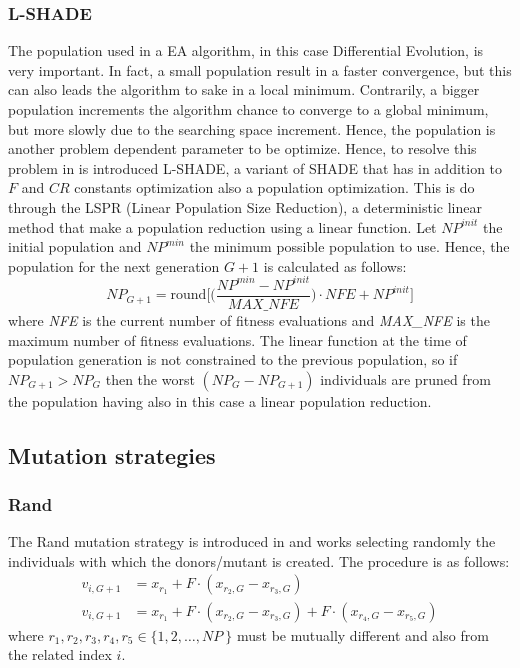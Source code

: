 \subsubsection{L-SHADE}
The population used in a EA algorithm, in this case Differential Evolution, is very important. In fact, a small population result in a faster convergence, but this can also leads the algorithm to sake in a local minimum. Contrarily, a bigger population increments the algorithm chance to converge to a global minimum, but more slowly due to the searching space increment. Hence, the population is another problem dependent parameter to be optimize.\newline\newline
Hence, to resolve this problem in \cite{LSHADE:2014} is introduced L-SHADE, a variant of SHADE that has in addition to $F$ and $\textit{CR}$ constants optimization also a population optimization. This is do through the LSPR (Linear Population Size Reduction), a deterministic linear method that make a population reduction using a linear function.\newline\newline
Let $\textit{NP}^{\textit{init}}$ the initial population and $\textit{NP}^{\textit{min}}$ the minimum possible population to use. Hence, the population for the next generation $G + 1$ is calculated as follows:
\begin{equation}
	\textit{NP}_{G + 1} = \textrm{round}\Bigg[\Bigg(\frac{\textit{NP}^{\textit{min}} - \textit{NP}^{\textit{init}}}{\textit{MAX\_NFE}} \Bigg) \cdot \textit{NFE} + \textit{NP}^{\textit{init}} \Bigg]
\end{equation}
where \textit{NFE} is the current number of fitness evaluations and \textit{MAX\_NFE} is the maximum number of fitness evaluations. The linear function at the time of population generation is not constrained to the previous population, so if $\textit{NP}_{G + 1} > \textit{NP}_{G}$ then the worst $(\textit{NP}_{G} - \textit{NP}_{G+1})$ individuals are pruned from the population having also in this case a linear population reduction.
\subsection{Mutation strategies}

\subsubsection{Rand}
The Rand mutation strategy is introduced in \cite{DESEHGOCS:1997} and works selecting randomly the individuals with which the donors/mutant is created. The procedure is as follows:
\begin{align}
	v_{i, G + 1} &= x_{r_{1}} + F \cdot (x_{r_2, G} - x_{r_3, G}) \\
	v_{i, G + 1} &= x_{r_{1}} + F \cdot (x_{r_2, G} - x_{r_3, G}) + F \cdot (x_{r_4, G} - x_{r_5, G})
\end{align}
where $r_1, r_2, r_3, r_4, r_5 \in \{1, 2, \dots, \textit{NP}\ \}$ must be mutually different and also from the related index $i$.

